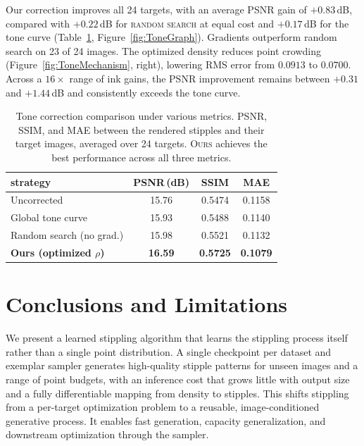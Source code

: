 \documentclass{egpubl}
\begin{document}
Our correction improves all 24 targets, with an average PSNR gain of $+0.83$\,dB, compared with $+0.22$\,dB for \textsc{random search} at equal cost and $+0.17$\,dB for the tone curve (Table~\ref{tab:tone}, Figure~\ref{fig:ToneGraph}). Gradients outperform random search on 23 of 24 images. The optimized density reduces point crowding (Figure~\ref{fig:ToneMechanism}, right), lowering RMS error from $0.0913$ to $0.0700$. Across a $16\times$ range of ink gains, the PSNR improvement remains between $+0.31$ and $+1.44$\,dB and consistently exceeds the tone curve.

\begin{table}[t]
\centering
\small
\begin{tabular}{lccc}
\toprule
strategy & PSNR\,(dB) & SSIM & MAE \\
\midrule
Uncorrected                & 15.76 & 0.5474 & 0.1158 \\
Global tone curve          & 15.93 & 0.5488 & 0.1140 \\
Random search (no grad.)   & 15.98 & 0.5521 & 0.1132 \\
\textbf{Ours (optimized $\rho$)} & \textbf{16.59} & \textbf{0.5725} & \textbf{0.1079} \\
\bottomrule
\end{tabular}
\caption{Tone correction comparison under various metrics.  PSNR, SSIM, and MAE between the rendered stipples and their target images, averaged over 24 targets. \textsc{Ours} achieves the best performance across all three metrics.
}
\label{tab:tone}
\end{table}

\section{Conclusions and Limitations}

We present a learned stippling algorithm that learns the stippling process itself rather than a single point distribution. A single checkpoint per dataset and exemplar sampler generates high-quality stipple patterns for unseen images and a range of point budgets, with an inference cost that grows little with output size and a fully differentiable mapping from density to stipples. This shifts stippling from a per-target optimization problem to a reusable, image-conditioned generative process. It enables fast generation, capacity generalization, and downstream optimization through the sampler.
\end{document}
